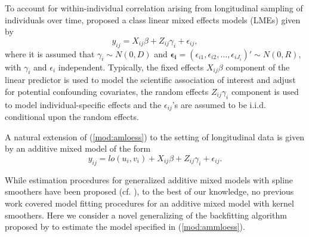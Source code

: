 	To account for within-individual correlation arising from longitudinal sampling of individuals over time, \citet{laird1982random} proposed a class linear mixed effects models (LMEs) given by 
	\begin{equation} \label{mod:lmm}
	y_{ij}=X_{ij}\beta+Z_{ij}\gamma_i+\epsilon_{ij},
	\end{equation}
	where it is assumed that $\gamma_i \sim N(0,D)$ and $\mathbf{\epsilon_i}=(\epsilon_{i1},\epsilon_{i2},\dots,\epsilon_{iJ_i})' \sim N(0,R)$, with $\gamma_i$ and $\epsilon_i$ independent. Typically, the fixed effects $X_{ij}\beta$ component of the linear predictor is used to model the scientific association of interest and adjust for potential confounding covariates, the random effects $Z_{ij}\gamma_i$ component is used to model individual-specific effects and the $\epsilon_{ij}$'s are assumed to be i.i.d. conditional upon the random effects. 
	
	A natural extension of (\ref{mod:amloess}) to the setting of longitudinal data is given by an additive mixed model of the form
	\begin{equation} \label{mod:ammloess}
	y_{ij}=lo(u_i,v_i)+X_{ij}\beta+Z_{ij}\gamma_i+\epsilon_{ij}.
	\end{equation}
	
	
	\noindent While estimation procedures for generalized additive mixed models with spline smoothers have been proposed (cf. \cite{lin1999inference}), to the best of our knowledge, no previous work covered model fitting procedures for an additive mixed model with kernel smoothers. Here we consider a novel generalizing of the backfitting algorithm proposed by \citet{breiman1985estimating} to estimate the model specified in (\ref{mod:ammloess}).  
	
